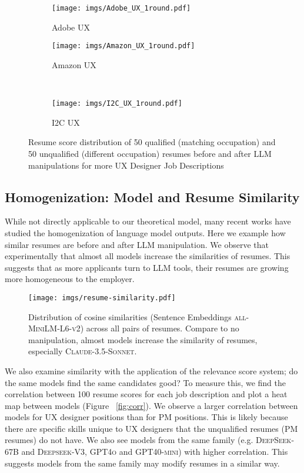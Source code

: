 \begin{figure*}
    \centering
    \begin{subfigure}{0.3\textwidth}
        \centering
        \texttt{[image: imgs/Adobe\_UX\_1round.pdf]}
        \caption{Adobe UX}
    \end{subfigure}%
    \begin{subfigure}{0.3\textwidth}
        \centering
        \texttt{[image: imgs/Amazon\_UX\_1round.pdf]}
        \caption{Amazon UX}
    \end{subfigure}
    ~
    \begin{subfigure}{0.3\textwidth}
        \centering
        \texttt{[image: imgs/I2C\_UX\_1round.pdf]}
        \caption{I2C UX}
    \end{subfigure}%

    \caption{Resume score distribution of 50 qualified (matching occupation) and 50 unqualified (different occupation) resumes before and after LLM manipulations for more UX Designer Job Descriptions}
    \label{fig:1pass-additional-ux}
\end{figure*}
\subsection{Homogenization: Model and Resume Similarity}
While not directly applicable to our theoretical model, many recent works have studied the homogenization of language model outputs. Here we example how similar resumes are before and after LLM manipulation. We observe that experimentally that almost all models increase the similarities of resumes. This suggests that as more applicants turn to LLM tools, their resumes are growing more homogeneous to the employer. 


\begin{figure}
    \centering
    \texttt{[image: imgs/resume-similarity.pdf]}
    \caption{Distribution of cosine similarities (Sentence Embeddings \textsc{all-MiniLM-L6-v2}) across all pairs of resumes. Compare to no manipulation, almost models increase the similarity of resumes, especially \textsc{Claude-3.5-Sonnet}.}
    \label{fig:resume_sim}
\end{figure}


We also examine similarity with the application of the relevance score system; do the same models find the same candidates good? To measure this, we find the correlation between 100 resume scores for each job description and plot a heat map between models (Figure ~\ref{fig:corr}). We observe a larger correlation between models for UX designer positions than for PM positions. This is likely because there are specific skills unique to UX designers that the unqualified resumes (PM resumes) do not have. We also see models from the same family (e.g. \textsc{DeepSeek-67B} and \textsc{Deepseek-V3}, \textsc{GPT4o} and \textsc{GPT40-mini}) with higher correlation.  This suggests models from the same family may modify resumes in a similar way. 

